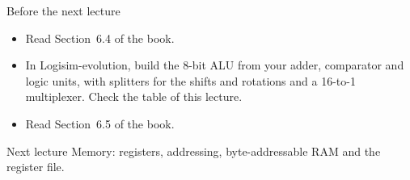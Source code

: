 \documentclass[10pt]{wosm-slides}
\begin{document}
\begin{frame}{Before the next lecture}
  \begin{itemize}
    \item Read Section~6.4 of the book.
    \item In Logisim-evolution, build the 8-bit ALU from your adder, comparator and
      logic units, with splitters for the shifts and rotations and a 16-to-1
      multiplexer. Check the table of this lecture.
    \item Read Section~6.5 of the book.
  \end{itemize}

  \begin{block}{Next lecture }
    Memory: registers, addressing, byte-addressable RAM and the register file.
  \end{block}
\end{frame}
\end{document}
